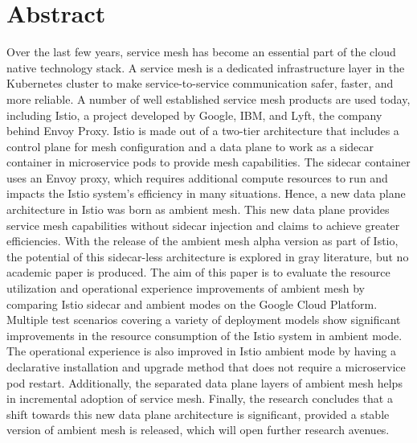 \section*{Abstract}
Over the last few years, service mesh has become an essential part of the cloud native technology stack. A service mesh is a dedicated infrastructure layer in the Kubernetes cluster to make service-to-service communication safer, faster, and more reliable. A number of well established service mesh products are used today, including Istio, a project developed by Google, IBM, and Lyft, the company behind Envoy Proxy. Istio is made out of a two-tier architecture that includes a control plane for mesh configuration and a data plane to work as a sidecar container in microservice pods to provide mesh capabilities. The sidecar container uses an Envoy proxy, which requires additional compute resources to run and impacts the Istio system's efficiency in many situations. Hence, a new data plane architecture in Istio was born as ambient mesh. This new data plane provides service mesh capabilities without sidecar injection and claims to achieve greater efficiencies. With the release of the ambient mesh alpha version as part of Istio, the potential of this sidecar-less architecture is explored in gray literature, but no academic paper is produced. The aim of this paper is to evaluate the resource utilization and operational experience improvements of ambient mesh by comparing Istio sidecar and ambient modes on the Google Cloud Platform. Multiple test scenarios covering a variety of deployment models show significant improvements in the resource consumption of the Istio system in ambient mode. The operational experience is also improved in Istio ambient mode by having a declarative installation and upgrade method that does not require a microservice pod restart. Additionally, the separated data plane layers of ambient mesh helps in incremental adoption of service mesh. Finally, the research concludes that a shift towards this new data plane architecture is significant, provided a stable version of ambient mesh is released, which will open further research avenues.